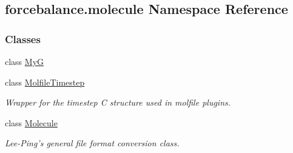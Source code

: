 \hypertarget{namespaceforcebalance_1_1molecule}{\subsection{forcebalance.\-molecule Namespace Reference}
\label{namespaceforcebalance_1_1molecule}
}
\subsubsection*{Classes}
\begin{DoxyCompactItemize}
\item 
class \hyperlink{classforcebalance_1_1molecule_1_1MyG}{My\-G}
\item 
class \hyperlink{classforcebalance_1_1molecule_1_1MolfileTimestep}{Molfile\-Timestep}
\begin{DoxyCompactList}\small\item\em Wrapper for the timestep C structure used in molfile plugins. \end{DoxyCompactList}\item 
class \hyperlink{classforcebalance_1_1molecule_1_1Molecule}{Molecule}
\begin{DoxyCompactList}\small\item\em Lee-\/\-Ping's general file format conversion class. \end{DoxyCompactList}\end{DoxyCompactItemize}
